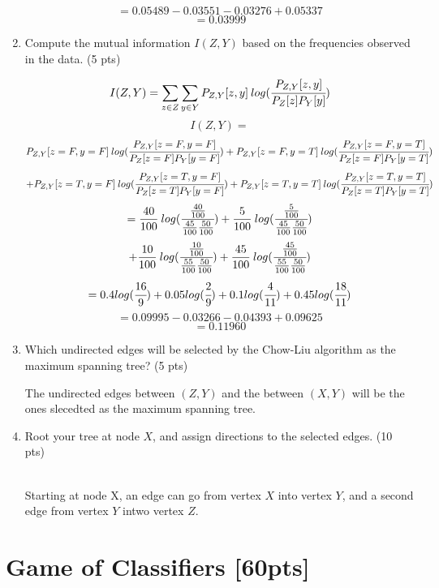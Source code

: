 \documentclass[a4paper]{article}
\theoremstyle{definition}
\newenvironment{soln}{
    \leavevmode\color{blue}\ignorespaces
}{}
\begin{document}
\begin{enumerate}
\begin{soln}
        \[  = 0.05489 - 0.03551 - 0.03276 + 0.05337\]
        \[  = 0.03999 \]
    \end{soln}
	\item Compute the mutual information $I(Z, Y)$ based on the frequencies observed in the data. (5 pts)
	\begin{soln}
        \[  I(Z, Y) = \sum_{z \in Z} \sum_{y \in Y} P_{Z,Y}[z, y]\:log(\cfrac{P_{Z,Y}[z, y]}{P_Z[z]P_Y[y]})  \]
        \[  I(Z, Y) = \]
        \[ P_{Z,Y}[z=F, y=F]\:log(\cfrac{P_{Z,Y}[z=F, y=F]}{P_Z[z=F]P_Y[y=F]}) + P_{Z,Y}[z=F, y=T]\:log(\cfrac{P_{Z,Y}[z=F, y=T]}{P_Z[z=F]P_Y[y=T]})\]
        \[  + P_{Z,Y}[z=T, y=F]\:log(\cfrac{P_{Z,Y}[z=T, y=F]}{P_Z[z=T]P_Y[y=F]}) + P_{Z,Y}[z=T, y=T]\:log(\cfrac{P_{Z,Y}[z=T, y=T]}{P_Z[z=T]P_Y[y=T]})\]
        \[  = \frac{40}{100}\:log(\cfrac{\frac{40}{100}}{\frac{45}{100}\frac{50}{100}}) + \frac{5}{100}\:log(\cfrac{\frac{5}{100}}{\frac{45}{100}\frac{50}{100}})\]
        \[  + \frac{10}{100}\:log(\cfrac{\frac{10}{100}}{\frac{55}{100}\frac{50}{100}}) + \frac{45}{100}\:log(\cfrac{\frac{45}{100}}{\frac{55}{100}\frac{50}{100}})\]
        \[  = 0.4log(\cfrac{16}{9}) + 0.05log(\cfrac{2}{9}) + 0.1log(\cfrac{4}{11}) + 0.45log(\cfrac{18}{11}) \]
        \[  = 0.09995 - 0.03266 - 0.04393 +  0.09625\]
        \[  = 0.11960 \]
    \end{soln}
	\item Which undirected edges will be selected by the Chow-Liu algorithm as the maximum spanning tree? (5 pts)
	\begin{soln}
        The undirected edges between $(Z, Y)$ and the between $(X, Y)$ will be the ones slecedted as the maximum spanning tree.
    \end{soln}
	\item Root your tree at node $X$, and assign directions to the selected edges. (10 pts)
	\begin{soln}
        \\Starting at node X, an edge can go from vertex $X$ into vertex $Y$, and a second edge from vertex $Y$ intwo vertex $Z$.
    \end{soln}
\end{enumerate}

\section{Game of Classifiers [60pts]}
\end{document}
